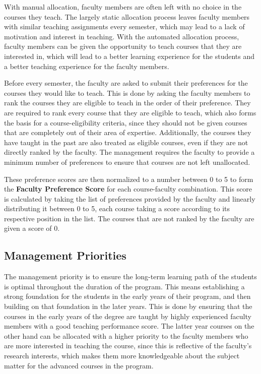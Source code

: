 With manual allocation, faculty members are often left with no choice in the courses they teach. The largely static allocation process leaves faculty members with similar teaching assignments every semester, which may lead to a lack of motivation and interest in teaching. With the automated allocation process, faculty members can be given the opportunity to teach courses that they are interested in, which will lead to a better learning experience for the students and a better teaching experience for the faculty members.

Before every semester, the faculty are asked to submit their preferences for the courses they would like to teach. This is done by asking the faculty members to rank the courses they are eligible to teach in the order of their preference. They are required to rank every course that they are eligible to teach, which also forms the basis for a course-eligibility criteria, since they should not be given courses that are completely out of their area of expertise. Additionally, the courses they have taught in the past are also treated as eligible courses, even if they are not directly ranked by the faculty. The management requires the faculty to provide a minimum number of preferences to ensure that courses are not left unallocated.

These preference scores are then normalized to a number between 0 to 5 to form the \textbf{Faculty Preference Score} for each course-faculty combination. This score is calculated by taking the list of preferences provided by the faculty and linearly distributing it between 0 to 5, each course taking a score according to its respective position in the list. The courses that are not ranked by the faculty are given a score of 0.

\subsection{Management Priorities}

The management priority is to ensure the long-term learning path of the students is optimal throughout the duration of the program. This means establishing a strong foundation for the students in the early years of their program, and then building on that foundation in the later years. This is done by ensuring that the courses in the early years of the degree are taught by highly experienced faculty members with a good teaching performance score. The latter year courses on the other hand can be allocated with a higher priority to the faculty members who are more interested in teaching the course, since this is reflective of the faculty's research interests, which makes them more knowledgeable about the subject matter for the advanced courses in the program.

